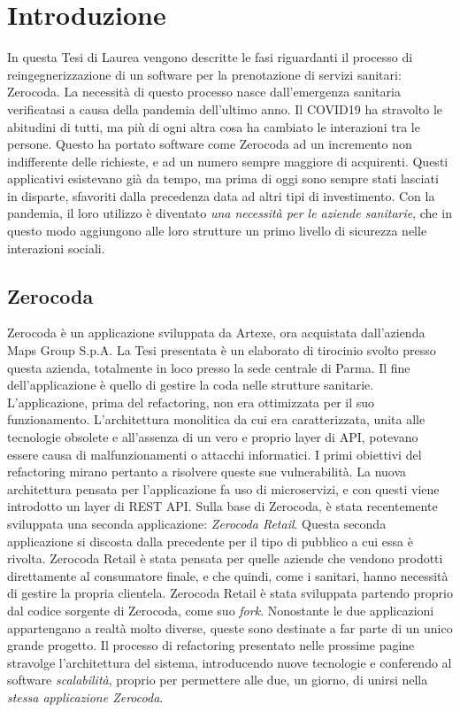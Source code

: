 \chapter*{Introduzione}
\label{chap:introduction}
In questa Tesi di Laurea vengono descritte le fasi riguardanti il processo di reingegnerizzazione di un software per la prenotazione di servizi sanitari: Zerocoda. La necessità di questo processo nasce dall'emergenza sanitaria verificatasi a causa della pandemia dell'ultimo anno. Il COVID19 ha stravolto le abitudini di tutti, ma più di ogni altra cosa ha cambiato le interazioni tra le persone. Questo ha portato software come Zerocoda ad un incremento non indifferente delle richieste, e ad un numero sempre maggiore di acquirenti. Questi applicativi esistevano già da tempo, ma prima di oggi sono sempre stati lasciati in disparte, sfavoriti dalla precedenza data ad altri tipi di investimento. Con la pandemia, il loro utilizzo è diventato \emph{una necessità per le aziende sanitarie}, che in questo modo aggiungono alle loro strutture un primo livello di sicurezza nelle interazioni sociali.

\section*{Zerocoda}
Zerocoda è un applicazione sviluppata da Artexe, ora acquistata dall'azienda Maps Group S.p.A. La Tesi presentata è un elaborato di tirocinio svolto presso questa azienda, totalmente in loco presso la sede centrale di Parma. Il fine dell'applicazione è quello di gestire la coda nelle strutture sanitarie. L'applicazione, prima del refactoring, non era ottimizzata per il suo funzionamento. L'architettura monolitica da cui era caratterizzata, unita alle tecnologie obsolete e all'assenza di un vero e proprio layer di API, potevano essere causa di malfunzionamenti o attacchi informatici. I primi obiettivi del refactoring mirano pertanto a risolvere queste sue vulnerabilità. La nuova architettura pensata per l'applicazione fa uso di microservizi, e con questi viene introdotto un layer di REST API.  Sulla base di Zerocoda, è stata recentemente sviluppata una seconda applicazione: \emph{Zerocoda Retail}. Questa seconda applicazione si discosta dalla precedente per il tipo di pubblico a cui essa è rivolta. Zerocoda Retail è stata pensata per quelle aziende che vendono prodotti direttamente al consumatore finale, e che quindi, come i sanitari, hanno necessità di gestire la propria clientela. Zerocoda Retail è stata sviluppata partendo proprio dal codice sorgente di Zerocoda, come suo \emph{fork}. Nonostante le due applicazioni appartengano a realtà molto diverse, queste sono destinate a far parte di un unico grande progetto. Il processo di refactoring presentato nelle prossime pagine stravolge l'architettura del sistema, introducendo nuove tecnologie e conferendo al software \emph{scalabilità}, proprio per permettere alle due, un giorno, di unirsi nella \emph{stessa applicazione Zerocoda}.


